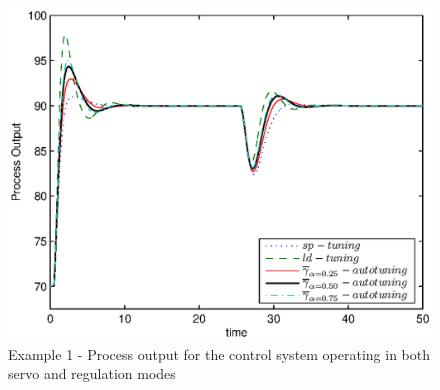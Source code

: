 \begin{figure}[htb!]
    \begin{center}
        \includegraphics[width=0.8\linewidth]{youtp0.eps}
        \caption{Example 1 - Process output for the control system operating in both servo and regulation modes}
        \label{y_out}
    \end{center}
\end{figure}




